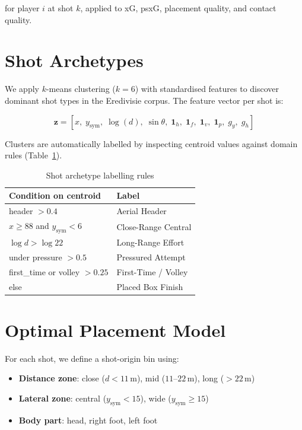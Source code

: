\documentclass[12pt,a4paper]{article}
\begin{document}
for player $i$ at shot $k$, applied to xG, psxG, placement quality, and contact quality.

\section{Shot Archetypes}
\label{sec:archetypes}

We apply $k$-means clustering ($k=6$) with standardised features to discover dominant shot types in the Eredivisie corpus. The feature vector per shot is:

\begin{equation}
\mathbf{z} = [x,\; y_\text{sym},\; \log(d),\; \sin\theta,\; \mathbf{1}_h,\; \mathbf{1}_f,\; \mathbf{1}_v,\; \mathbf{1}_p,\; g_y,\; g_h]
\end{equation}

Clusters are automatically labelled by inspecting centroid values against domain rules (Table~\ref{tab:archetypes}).

\begin{table}[H]
\centering
\caption{Shot archetype labelling rules}
\label{tab:archetypes}
\begin{tabular}{ll}
\toprule
\textbf{Condition on centroid} & \textbf{Label} \\
\midrule
header $> 0.4$                       & Aerial Header \\
$x \geq 88$ and $y_\text{sym} < 6$  & Close-Range Central \\
$\log d > \log 22$                   & Long-Range Effort \\
under pressure $> 0.5$               & Pressured Attempt \\
first\_time or volley $> 0.25$       & First-Time / Volley \\
else                                 & Placed Box Finish \\
\bottomrule
\end{tabular}
\end{table}

\section{Optimal Placement Model}
\label{sec:optimal}

For each shot, we define a shot-origin bin using:
\begin{itemize}
    \item \textbf{Distance zone}: close ($d < 11\,\text{m}$), mid ($11$--$22\,\text{m}$), long ($>22\,\text{m}$)
    \item \textbf{Lateral zone}: central ($y_\text{sym} < 15$), wide ($y_\text{sym} \geq 15$)
    \item \textbf{Body part}: head, right foot, left foot
\end{itemize}
\end{document}

